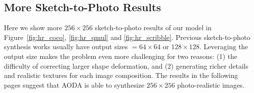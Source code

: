 \documentclass[10pt,twocolumn,letterpaper]{article}
\begin{document}
\begin{table}[t]
\centering
{}
\caption{Results of quantitative evaluation and user preference study on QMUL-Sketch dataset. Best results are shown in \textbf{bold}.}
\label{tab:qmul}
\end{table}



\subsection{More Sketch-to-Photo Results}
\label{sec:s2p_syn}
Here we show more $256\times 256$ sketch-to-photo results of our model in Figure~\ref{fig:hr_coco}, \ref{fig:hr_qmul} and \ref{fig:hr_scribble}. Previous sketch-to-photo synthesis works usually have output sizes $=64 \times 64$ or $128 \times 128$. Leveraging the output size makes the problem even more challenging for two reasons: (1) the difficulty of correcting larger shape deformation, and (2) generating richer details and realistic textures for each image composition. The results in the following pages suggest that AODA is able to synthesize $256\times 256$ photo-realistic images.
\end{document}
